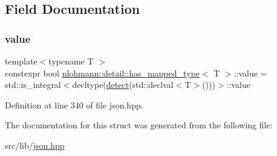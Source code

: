 \subsection{Field Documentation}
\mbox{\label{structnlohmann_1_1detail_1_1has__mapped__type_aa7bb3b246c9c936fa6aca4d9b7cda5a2}} 
\subsubsection{\texorpdfstring{value}{value}}
{\footnotesize\ttfamily template$<$typename T $>$ \\
constexpr bool \hyperlink{structnlohmann_1_1detail_1_1has__mapped__type}{nlohmann\+::detail\+::has\+\_\+mapped\+\_\+type}$<$ T $>$\+::value = std\+::is\+\_\+integral$<$decltype(\hyperlink{structnlohmann_1_1detail_1_1has__mapped__type_aedb1b3019f656eb415cbe0b77d7546c4}{detect}(std\+::declval$<$T$>$()))$>$\+::value\hspace{0.3cm}{\ttfamily [static]}}



Definition at line 340 of file json.\+hpp.



The documentation for this struct was generated from the following file\+:\begin{DoxyCompactItemize}
\item 
src/lib/\hyperlink{json_8hpp}{json.\+hpp}\end{DoxyCompactItemize}

